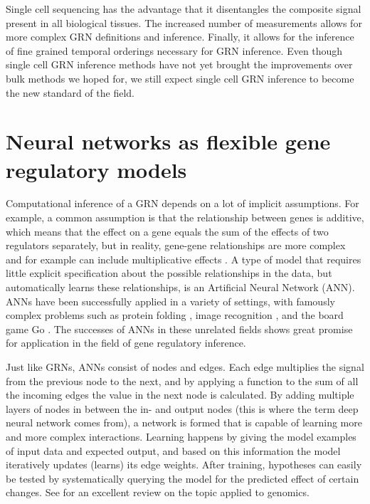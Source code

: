 Single cell sequencing has the advantage that it disentangles the composite signal present in all biological tissues. The increased number of measurements allows for more complex GRN definitions and inference. Finally, it allows for the inference of fine grained temporal orderings necessary for GRN inference. Even though single cell GRN inference methods have not yet brought the improvements over bulk methods we hoped for, we still expect single cell GRN inference to become the new standard of the field.

\section{Neural networks as flexible gene regulatory models}

Computational inference of a GRN depends on a lot of implicit assumptions. For example, a common assumption is that the relationship between genes is additive, which means that the effect on a gene equals the sum of the effects of two regulators separately, but in reality, gene-gene relationships are more complex and for example can include multiplicative effects \cite{Kim_2021}. A type of model that requires little explicit specification about the possible relationships in the data, but automatically learns these relationships, is an Artificial Neural Network (ANN). ANNs have been successfully applied in a variety of settings, with famously complex problems such as protein folding \cite{Jumper_2021}, image recognition \cite{Krizhevsky2017}, and the board game Go \cite{Silver_2016}. The successes of ANNs in these unrelated fields shows great promise for application in the field of gene regulatory inference.

Just like GRNs, ANNs consist of nodes and edges. Each edge multiplies the signal from the previous node to the next, and by applying a function to the sum of all the incoming edges the value in the next node is calculated. By adding multiple layers of nodes in between the in- and output nodes (this is where the term deep neural network comes from), a network is formed that is capable of learning more and more complex interactions. Learning happens by giving the model examples of input data and expected output, and based on this information the model iteratively updates (learns) its edge weights. After training, hypotheses can easily be tested by systematically querying the model for the predicted effect of certain changes. See \cite{Eraslan_2019} for an excellent review on the topic applied to genomics.

